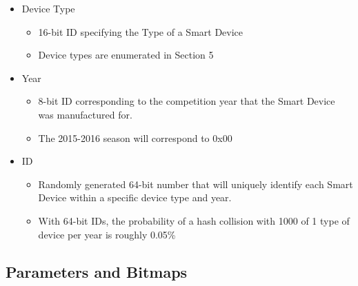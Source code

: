\documentclass[12pt]{book}
\begin{document}
\begin{itemize}
	\item Device Type
	\begin{itemize}
		\item 16-bit ID specifying the Type of a Smart Device
		\item Device types are enumerated in Section 5
	\end{itemize}
	\item Year
	\begin{itemize}
		\item 8-bit ID corresponding to the competition year that the Smart Device was manufactured for.
		\item The 2015-2016 season will correspond to 0x00
	\end{itemize}
	\item ID
  	\begin{itemize}
  		\item Randomly generated 64-bit number that will uniquely identify each Smart Device within a specific device type and year.
  		\item With 64-bit IDs, the probability of a hash collision with 1000 of 1 type of device per year is roughly 0.05\%
	\end{itemize}
\end{itemize}

\subsection{Parameters and Bitmaps}
\end{document}
